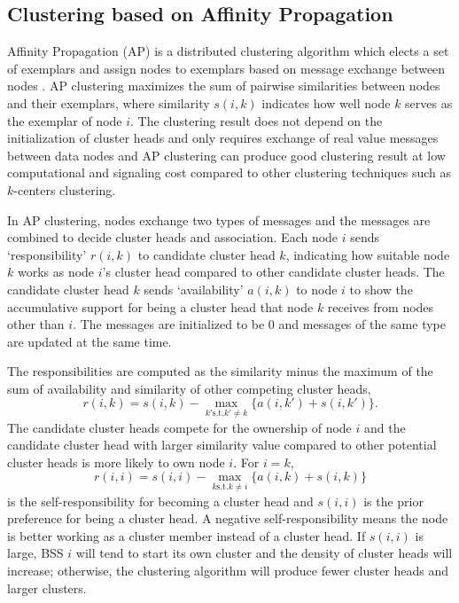 \documentclass[10pt, conference, letterpaper]{IEEEtran}
\begin{document}
\subsection{Clustering based on Affinity Propagation}
Affinity Propagation (AP) \cite{apcluster} is a distributed clustering algorithm which elects a set of exemplars and assign nodes to exemplars based on message exchange between nodes . AP clustering maximizes the sum of pairwise similarities between nodes and their exemplars, where similarity $s(i,k)$ indicates how well node $k$ serves as the exemplar of node $i$. The clustering result does not depend on the initialization of cluster heads and only requires exchange of real value messages between data nodes and AP clustering can produce good clustering result at low computational and signaling cost compared to other clustering techniques such as $k$-centers clustering.

In AP clustering, nodes exchange two types of messages and the messages are combined to decide cluster heads and association. Each node $i$ sends `responsibility' $r(i,k)$ to candidate cluster head $k$, indicating how suitable node $k$ works as node $i$'s cluster head compared to other candidate cluster heads. The candidate cluster head $k$ sends `availability' $a(i,k)$ to node $i$ to show the accumulative support for being a cluster head that node $k$ receives from nodes other than $i$. The messages are initialized to be 0 and messages of the same type are updated at the same time. 

The responsibilities are computed as the similarity minus the maximum of the sum of availability and similarity of other competing cluster heads,
\begin{equation}\label{eq:r_update}
r(i,k) = s(i,k) - \max_{k'\text{s.t.}k'\neq k}\{a(i,k') + s(i,k')\}.
\end{equation}
The candidate cluster heads compete for the ownership of node $i$ and the candidate cluster head with larger similarity value compared to other potential cluster heads is more likely to own node $i$. For $i = k$, 
$$r(i,i) = s(i,i) - \max_{k\text{s.t.}k\neq i}\{a(i,k) + s(i,k)\}$$ is the self-responsibility for becoming a cluster head and $s(i,i)$ is the prior preference for being a cluster head. A negative self-responsibility means the node is better working as a cluster member instead of a cluster head. If $s(i,i)$ is large, BSS $i$ will tend to start its own cluster and the density of cluster heads will increase; otherwise, the clustering algorithm will produce fewer cluster heads and larger clusters.
\end{document}
